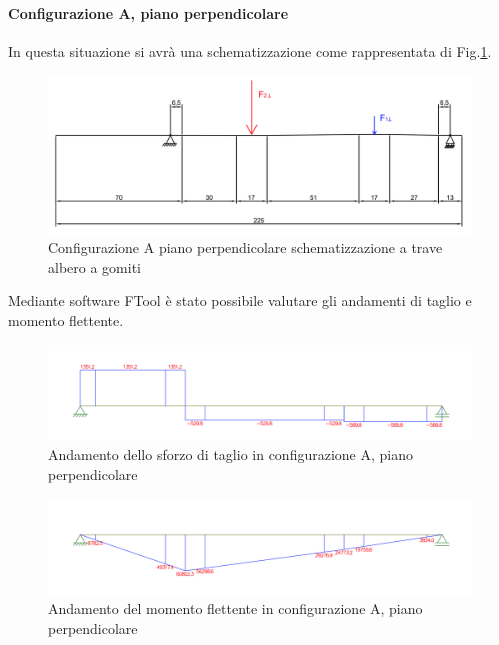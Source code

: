 \paragraph{Configurazione A, piano perpendicolare}
In questa situazione si avrà una schematizzazione come rappresentata di Fig.\ref{fig:SchemaAlberoAPerp}.
\begin{figure}[h]
    \centering
    \includegraphics[scale=0.5]{Immagini/SchemaAlberoAPerp.png}
    \caption{Configurazione A piano perpendicolare schematizzazione a trave albero a gomiti}
    \label{fig:SchemaAlberoAPerp}
\end{figure}

Mediante software FTool è stato possibile valutare gli andamenti di taglio e momento flettente. 
\begin{figure}[h]
    \centering
    \includegraphics[scale=0.5]{Immagini/AndamentoTaglioAAlberoPerp.png}
    \caption{Andamento dello sforzo di taglio in configurazione A, piano perpendicolare}
    \label{fig:AndamentoTalioAAlberoPerp}
\end{figure}
\begin{figure}[h]
    \centering
    \includegraphics[scale=0.5]{Immagini/AndamentoMomentoAAlberoPerp.png}
    \caption{Andamento del momento flettente in configurazione A, piano perpendicolare}
    \label{fig:AndamentoMomentoAAlberoPerp}
\end{figure}
\newpage
